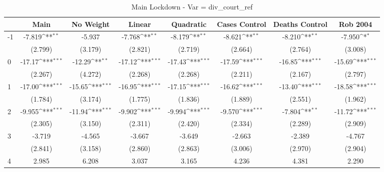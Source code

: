 \documentclass{article}
\begin{document}
{
\def\sym#1{\ifmmode^{#1}\else\(^{#1}\)\fi}
\begin{longtable}{l*{7}{c}}
\caption{Main Lockdown - Var = div\_court\_ref}\\
\hline\hline\endfirsthead\hline\endhead\hline\endfoot\endlastfoot
                &\multicolumn{1}{c}{Main}&\multicolumn{1}{c}{No Weight}&\multicolumn{1}{c}{Linear}&\multicolumn{1}{c}{Quadratic}&\multicolumn{1}{c}{Cases Control}&\multicolumn{1}{c}{Deaths Control}&\multicolumn{1}{c}{Rob 2004}\\
\hline
-1              &   -7.819\sym{**} &   -5.937         &   -7.768\sym{**} &   -8.179\sym{**} &   -8.621\sym{**} &   -8.210\sym{**} &   -7.950\sym{*}  \\
                &  (2.799)         &  (3.179)         &  (2.821)         &  (2.719)         &  (2.664)         &  (2.764)         &  (3.008)         \\
0               &   -17.17\sym{***}&   -12.29\sym{**} &   -17.12\sym{***}&   -17.43\sym{***}&   -17.59\sym{***}&   -16.85\sym{***}&   -15.69\sym{***}\\
                &  (2.267)         &  (4.272)         &  (2.268)         &  (2.268)         &  (2.211)         &  (2.167)         &  (2.797)         \\
1               &   -17.00\sym{***}&   -15.65\sym{***}&   -16.95\sym{***}&   -17.15\sym{***}&   -16.62\sym{***}&   -13.40\sym{***}&   -18.58\sym{***}\\
                &  (1.784)         &  (3.174)         &  (1.775)         &  (1.836)         &  (1.889)         &  (2.551)         &  (1.962)         \\
2               &   -9.955\sym{***}&   -11.94\sym{***}&   -9.902\sym{***}&   -9.994\sym{***}&   -9.570\sym{***}&   -7.804\sym{**} &   -11.72\sym{***}\\
                &  (2.305)         &  (3.150)         &  (2.311)         &  (2.420)         &  (2.334)         &  (2.289)         &  (2.909)         \\
3               &   -3.719         &   -4.565         &   -3.667         &   -3.649         &   -2.663         &   -2.389         &   -4.767         \\
                &  (2.841)         &  (3.158)         &  (2.860)         &  (2.863)         &  (3.006)         &  (2.970)         &  (2.904)         \\
4               &    2.985         &    6.208         &    3.037         &    3.165         &    4.236         &    4.381         &    2.290         \\

\end{longtable}}
\end{document}
